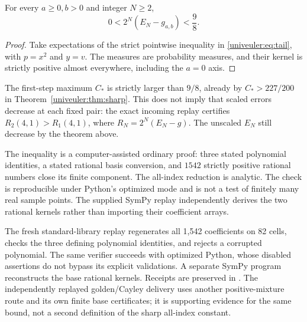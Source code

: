 \begin{corollary}
\label{latebudget:cor:error}
For every $a\ge0,b>0$ and integer $N\ge2$,
\[
 0<2^N(E_N-g_{a,b})<\frac98.
\]
\end{corollary}
\begin{proof}
Take expectations of the strict pointwise inequality in
\eqref{univeuler:eq:tail}, with $p=x^2$ and $y=v$.
The measures are probability measures, and their kernel is strictly
positive almost everywhere, including the $a=0$ axis.
\end{proof}
The first-step maximum $C_*$ is strictly larger than $9/8$, already by
$C_*>227/200$ in Theorem~\ref{univeuler:thm:sharp}. This does not imply
that scaled errors decrease at each fixed pair: the exact incoming replay
certifies $R_2(4,1)>R_1(4,1)$, where $R_N=2^N(E_N-g)$.
The unscaled $E_N$ still decrease by the theorem above.


\begin{remark}
The inequality is a computer-assisted ordinary proof: three stated polynomial identities, a stated rational basis conversion, and $1542$ strictly positive rational numbers close its finite component. The all-index reduction is analytic. The check is reproducible under Python's optimized mode and is not a test of finitely many real sample points. The supplied SymPy replay independently derives the two rational kernels rather than importing their coefficient arrays.
\end{remark}

The fresh standard-library replay regenerates all 1,542 coefficients on
82 cells, checks the three defining polynomial identities, and rejects a
corrupted polynomial. The same verifier succeeds with optimized Python,
whose disabled assertions do not bypass its explicit validations. A
separate SymPy program reconstructs the base rational kernels. Receipts
are preserved in . The independently
replayed golden/Cayley delivery uses another positive-mixture route and
its own finite base certificates; it is supporting evidence for the same
bound, not a second definition of the sharp all-index constant.
